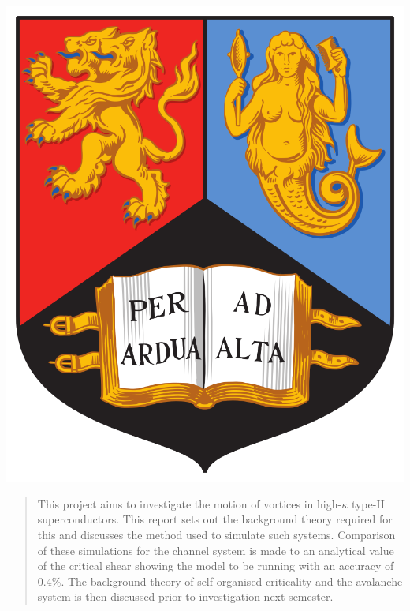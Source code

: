 \documentclass{article}
\numberwithin{equation}{section}
\begin{document}
\begin{minipage}{0.5\textwidth}\begin{flushright}	%
\includegraphics[scale = 0.06]{Resources/UoB}		%
\hspace*{20px}										%
\end{flushright}\end{minipage}						%
\vspace{20px}										%

\begin{abstract}
    This project aims to investigate the motion of vortices in high-$\kappa$ type-II superconductors. This report sets out the background theory required for this and discusses the method used to simulate such systems. Comparison of these simulations for the channel system is made to an analytical value of the critical shear showing the model to be running with an accuracy of $0.4\%$. The background theory of self-organised criticality and the avalanche system is then discussed prior to investigation next semester.
\end{abstract}
\tableofcontents
\end{document}
